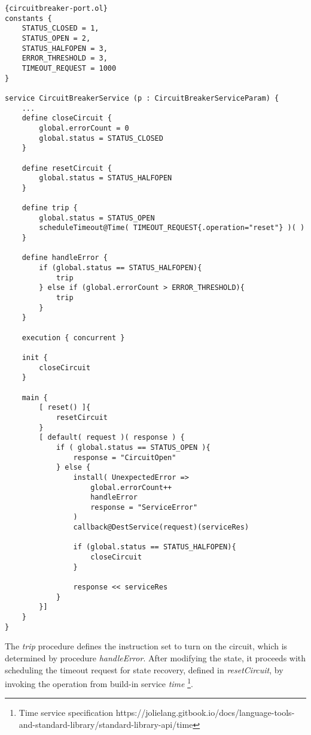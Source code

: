    \lstset{language=Jolie,
        style=codeStyle,
        breaklines=true,
        columns=fullflexible,
        numbers=left,
        breaklines=true,
        firstnumber=1
    }
    \begin{lstlisting}[frame=tlrb,
basicstyle=\footnotesize]{circuitbreaker-port.ol}
constants {
    STATUS_CLOSED = 1,
    STATUS_OPEN = 2,
    STATUS_HALFOPEN = 3,
    ERROR_THRESHOLD = 3,
    TIMEOUT_REQUEST = 1000
}

service CircuitBreakerService (p : CircuitBreakerServiceParam) {
    ...
    define closeCircuit {
        global.errorCount = 0
        global.status = STATUS_CLOSED
    }

    define resetCircuit {
        global.status = STATUS_HALFOPEN
    }

    define trip {
        global.status = STATUS_OPEN
        scheduleTimeout@Time( TIMEOUT_REQUEST{.operation="reset"} )( )
    }

    define handleError {
        if (global.status == STATUS_HALFOPEN){
            trip
        } else if (global.errorCount > ERROR_THRESHOLD){
            trip
        }
    }

    execution { concurrent }

    init {
        closeCircuit
    }

    main {        
        [ reset() ]{
            resetCircuit
        }
        [ default( request )( response ) {
            if ( global.status == STATUS_OPEN ){
                response = "CircuitOpen"
            } else {
                install( UnexpectedError =>
                    global.errorCount++
                    handleError
                    response = "ServiceError"
                )
                callback@DestService(request)(serviceRes)

                if (global.status == STATUS_HALFOPEN){
                    closeCircuit
                }

                response << serviceRes
            }
        }]
    }
}
\end{lstlisting}

The \textit{trip} procedure defines the instruction set to turn on the circuit, which is determined by procedure \textit{handleError}. After modifying the state, it proceeds with scheduling the timeout request for state recovery, defined in \textit{resetCircuit}, by invoking the operation from build-in service \textit{time} \footnote{Time service specification https://jolielang.gitbook.io/docs/language-tools-and-standard-library/standard-library-api/time}. 

